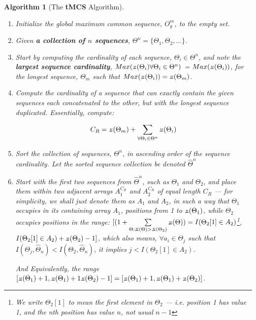 \documentclass[a4paper, 18pt]{book} %
\newtheorem{alg}{Algorithm}
\newcommand{\invpi}{\rotatebox[origin=c]{180}{$\pi$}}
\begin{document}
\begin{alg}[The \textbf{tMCS} Algorithm]
\label{ALGtMCS}
\begin{enumerate}
\item{Initialize the global maximum common sequence, $O^m_g$, to the empty set.} 
\item{
Given \textbf{a collection of $n$ sequences}, $\Theta^n = \{\Theta_1, \Theta_2,...\}$.
}
\item{
Start by computing the cardinality of each sequence, $\Theta_i \in \Theta^n$, and note the \textbf{largest sequence cardinality}, $Max(\invpi(\Theta_i) \forall \Theta_i \in \Theta^n)$ = $Max(\invpi(\Theta_i))$, for the longest sequence, $\Theta_m$ such that $Max(\invpi(\Theta_i)) = \invpi(\Theta_m)$.
}
\item {
Compute the cardinality of a sequence that can exactly contain the given sequences each concatenated to the other, but with the longest sequence duplicated. Essentially, compute:

\begin{equation}
\label{EQLSEQ}
C_R = \invpi(\Theta_m) + \sum\limits_{\forall \Theta_i \in \Theta^n} \invpi(\Theta_i)
\end{equation}

}
\item{
Sort the collection of sequences, $\Theta^n$, in ascending order of the sequence cardinality. Let the sorted sequence collection be denoted ${\hat{\Theta}}^n$
}
\item {
Start with the first two sequences from ${\hat{\Theta}}^n$, such as $\Theta_1$ and $\Theta_2$, and place them within two adjacent arrays $A_1^{C_R}$ and $A_2^{C_R}$ of equal length $C_R$ --- for simplicity, we shall just denote them as  $A_1$ and $A_2$, in such a way that $\Theta_1$ occupies in its containing array $A_1$, positions from 1 to $\invpi(\Theta_1)$, while $\Theta_2$ occupies positions in the range: $[(1 + \sum \limits_{\Theta: \invpi(\Theta) > \invpi(\Theta_2)}\invpi(\Theta)) = I(\Theta_2[1] \in A_2)$\footnote{We write $\Theta_2[1]$ to mean the first element in $\Theta_2$ --- i.e. position 1 has value 1, and the nth position has value $n$, not usual $n-1$}, $I(\Theta_2[1] \in A_2) + \invpi(\Theta_2) - 1]$, which also means, $\forall a_i \in \Theta_j$ such that $I(\Theta_j,\hat{\Theta}_n) <  I(\Theta_2, \hat{\Theta}_n)$, it implies $j < I(\Theta_2[1] \in A_2)$.

And Equivalently, the range $[\invpi(\Theta_1)+1, \invpi(\Theta_1)+ 1 \invpi(\Theta_2) - 1] = [\invpi(\Theta_1)+1, \invpi(\Theta_1)+ \invpi(\Theta_2)]$. 

}
\end{enumerate}
\end{alg}
\end{document}
